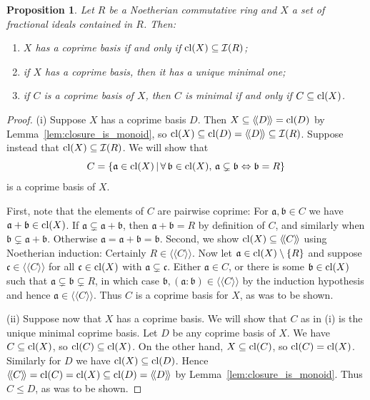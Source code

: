 \documentclass{amsart}
\theoremstyle{plain}
\newtheorem{proposition}[theorem]{Proposition}
\theoremstyle{definition}
\newcommand{\lla}{\langle\!\langle}
\newcommand{\rra}{\rangle\!\rangle}
\begin{document}
\begin{proposition}\label{prop:closure}
Let \(R\) be a Noetherian commutative ring and \(X\) a set of fractional ideals contained in \(R\). Then:
\begin{enumerate}[nosep,label=\textup{(\roman*)}]
\item \(X\) has a coprime basis if and only if \(\textup{cl}(X)\subseteq\mathcal{I}(R)\);
\item if \(X\) has a coprime basis, then it has a unique minimal one;
\item if \(C\) is a coprime basis of \(X\), then \(C\) is minimal if and only if \(C\subseteq\textup{cl}(X)\).
\end{enumerate}
\end{proposition}
\begin{proof}
(i) Suppose \(X\) has a coprime basis \(D\).
Then \(X\subseteq \lla D\rra = \textup{cl}(D)\) by Lemma~\ref{lem:closure_is_monoid}, so \(\textup{cl}(X)\subseteq\textup{cl}(D)=\lla D\rra \subseteq\mathcal{I}(R)\). 
Suppose instead that \(\textup{cl}(X)\subseteq \mathcal{I}(R)\).
We will show that
\[C=\{ \mathfrak{a}\in \textup{cl}(X) \,|\, \forall\, \mathfrak{b}\in \textup{cl}(X),\, \mathfrak{a}\subsetneq \mathfrak{b} \Leftrightarrow \mathfrak{b}=R\}\]
is a coprime basis of \(X\).

First, note that the elements of \(C\) are pairwise coprime: For \(\mathfrak{a},\mathfrak{b}\in C\) we have \(\mathfrak{a}+\mathfrak{b}\in \textup{cl}(X)\). If \(\mathfrak{a}\subsetneq \mathfrak{a}+\mathfrak{b}\), then \(\mathfrak{a}+\mathfrak{b}=R\) by definition of \(C\), and similarly when \(\mathfrak{b}\subsetneq\mathfrak{a}+\mathfrak{b}\). Otherwise \(\mathfrak{a}=\mathfrak{a}+\mathfrak{b}=\mathfrak{b}\).
Second, we show \(\textup{cl}(X)\subseteq\lla C\rra\) using Noetherian induction:
Certainly \(R\in\lla C\rra\). 
Now let \(\mathfrak{a}\in \textup{cl}(X)\setminus\{R\}\) and suppose \(\mathfrak{c}\in\lla C\rra\) for all \(\mathfrak{c}\in \textup{cl}(X)\) with \(\mathfrak{a}\subsetneq \mathfrak{c}\).
Either \(\mathfrak{a}\in C\), or there is some \(\mathfrak{b}\in \textup{cl}(X)\) such that \(\mathfrak{a}\subsetneq \mathfrak{b} \subsetneq R\), in which case \(\mathfrak{b}, (\mathfrak{a}:\mathfrak{b})\in\lla C\rra\) by the induction hypothesis and hence \(\mathfrak{a}\in\lla C\rra\). Thus \(C\) is a coprime basis for \(X\), as was to be shown.

(ii) Suppose now that \(X\) has a coprime basis. 
We will show that \(C\) as in (i) is the unique minimal coprime basis.
Let \(D\) be any coprime basis of \(X\).
We have \(C\subseteq\textup{cl}(X)\), so \(\textup{cl}(C) \subseteq \textup{cl}(X)\).
On the other hand, \(X\subseteq \textup{cl}(C)\), so \(\textup{cl}(C)=\textup{cl}(X)\).
Similarly for \(D\) we have \(\textup{cl}(X)\subseteq\textup{cl}(D)\).
Hence \(\lla C \rra =\textup{cl}(C)=\textup{cl}(X)\subseteq\textup{cl}(D)=\lla D\rra\) by Lemma~\ref{lem:closure_is_monoid}.
Thus \(C\leq D\), as was to be shown.


\end{proof}
\end{document}
